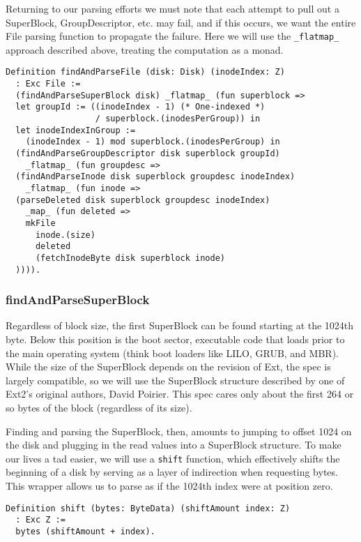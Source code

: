 \documentclass[nocopyrightspace]{sigplanconf}
\begin{document}
Returning to our parsing efforts we must note that each attempt to pull out a
SuperBlock, GroupDescriptor, etc. may fail, and if this occurs, we want the
entire File parsing function to propagate the failure. Here we will use the
{\tt \_flatmap\_} approach described above, treating the computation as a
monad.

\begin{lstlisting}
Definition findAndParseFile (disk: Disk) (inodeIndex: Z) 
  : Exc File :=
  (findAndParseSuperBlock disk) _flatmap_ (fun superblock =>
  let groupId := ((inodeIndex - 1) (* One-indexed *)
                  / superblock.(inodesPerGroup)) in
  let inodeIndexInGroup := 
    (inodeIndex - 1) mod superblock.(inodesPerGroup) in
  (findAndParseGroupDescriptor disk superblock groupId) 
    _flatmap_ (fun groupdesc =>
  (findAndParseInode disk superblock groupdesc inodeIndex) 
    _flatmap_ (fun inode =>
  (parseDeleted disk superblock groupdesc inodeIndex) 
    _map_ (fun deleted =>
    mkFile
      inode.(size)
      deleted
      (fetchInodeByte disk superblock inode)
  )))).
\end{lstlisting}

\subsubsection{findAndParseSuperBlock}

Regardless of block size, the first SuperBlock can be found starting at the
1024th byte. Below this position is the boot sector, executable code that
loads prior to the main operating system (think boot loaders like LILO, GRUB,
and MBR). While the size of the SuperBlock depends on the revision of Ext, the
spec is largely compatible, so we will use the SuperBlock structure described
by one of Ext2's original authors, David Poirier\cite{non-gnu}. This spec
cares only about the first 264 or so bytes of the block (regardless of its
size).

Finding and parsing the SuperBlock, then, amounts to jumping to offset 1024 on
the disk and plugging in the read values into a SuperBlock structure. To make
our lives a tad easier, we will use a {\tt shift} function, which effectively
shifts the beginning of a disk by serving as a layer of indirection when
requesting bytes. This wrapper allows us to parse as if the 1024th index were
at position zero.

\begin{lstlisting}
Definition shift (bytes: ByteData) (shiftAmount index: Z)
  : Exc Z :=
  bytes (shiftAmount + index).
\end{lstlisting}
\end{document}
